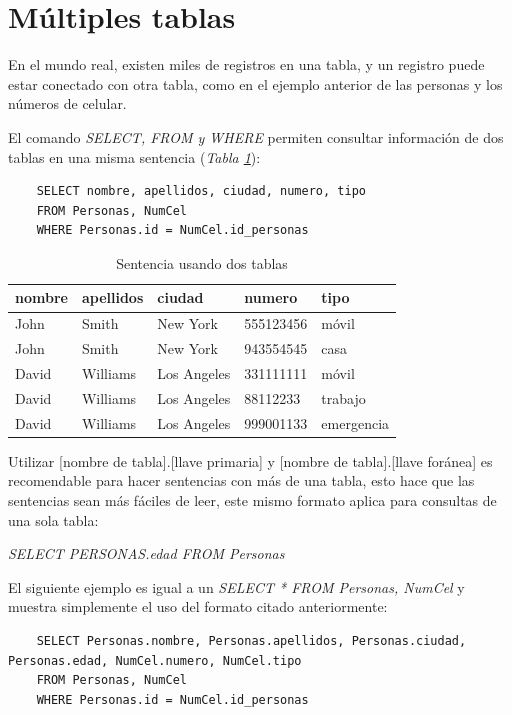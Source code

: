 \section{Múltiples tablas}

En el mundo real, existen miles de registros en una tabla, y un registro puede estar conectado con otra tabla, como en el ejemplo anterior de las personas y los números de celular.

El comando \textit{SELECT, FROM y WHERE} permiten consultar información de dos tablas en una misma sentencia (\textit{Tabla \ref{tab: 32}}):
\begin{lstlisting}
    SELECT nombre, apellidos, ciudad, numero, tipo
    FROM Personas, NumCel
    WHERE Personas.id = NumCel.id_personas
\end{lstlisting}
\begin{table}[H]
    \centering
    \caption{Sentencia usando dos tablas}
    \label{tab: 32}
    \begin{tabular}{|l|l|l|l|l|}
        \hline
        \textbf{nombre} & \textbf{apellidos} & \textbf{ciudad} & \textbf{numero} & \textbf{tipo} \\
        \hline
        John    & Smith     & New York      & 555123456 & móvil \\
        \hline
        John    & Smith     & New York      & 943554545 & casa \\
        \hline
        David   & Williams  & Los Angeles   & 331111111 & móvil \\
        \hline
        David   & Williams  & Los Angeles   & 88112233  & trabajo \\
        \hline
        David   & Williams  & Los Angeles   & 999001133 & emergencia \\
        \hline
    \end{tabular}
\end{table}

Utilizar [nombre de tabla].[llave primaria] y [nombre de tabla].[llave foránea] es recomendable para hacer sentencias con más de una tabla, esto hace que las sentencias sean más fáciles de leer, este mismo formato aplica para consultas de una sola tabla:
\begin{center}
    \textit{SELECT PERSONAS.edad FROM Personas}
\end{center}

El siguiente ejemplo es igual a un \textit{SELECT * FROM Personas, NumCel} y muestra simplemente el uso del formato citado anteriormente:
\begin{lstlisting}
    SELECT Personas.nombre, Personas.apellidos, Personas.ciudad, Personas.edad, NumCel.numero, NumCel.tipo
    FROM Personas, NumCel
    WHERE Personas.id = NumCel.id_personas
\end{lstlisting}



